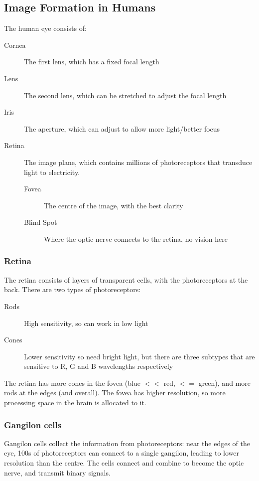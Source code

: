 \subsection{Image Formation in Humans}
The human eye consists of:
\begin{description}
    \item[Cornea] The first lens, which has a fixed focal length
    \item[Lens] The second lens, which can be stretched to adjust the focal length
    \item[Iris] The aperture, which can adjust to allow more light/better focus
    \item[Retina] The image plane, which contains millions of photoreceptors that transduce light to electricity. 
    \begin{description}
        \item [Fovea] The centre of the image, with the best clarity
        \item[Blind Spot] Where the optic nerve connects to the retina, no vision here
    \end{description}
\end{description}

\subsubsection{Retina}
The retina consists of layers of transparent cells, with the photoreceptors at the back. There are two types of photoreceptors:
\begin{description}
    \item[Rods] High sensitivity, so can work in low light
    \item[Cones] Lower sensitivity so need bright light, but there are three subtypes that are sensitive to R, G and B wavelengths respectively
\end{description}
The retina has more cones in the fovea (blue $<<$ red, $<=$ green), and more rods at the edges (and overall). The fovea has higher resolution, so more processing space in the brain is allocated to it. 

\subsubsection{Gangilon cells}
Gangilon cells collect the information from photoreceptors: near the edges of the eye, 100s of photoreceptors can connect to a single gangilon, leading to lower resolution than the centre. The cells connect and combine to become the optic nerve, and transmit binary signals.\\

